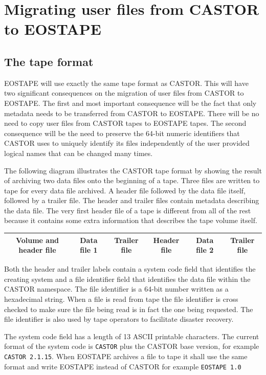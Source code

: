 \documentclass{article}
\begin{document}
\newpage
\section{Migrating user files from CASTOR to EOSTAPE}

\subsection{The tape format}

EOSTAPE will use exactly the same tape format as CASTOR.  This will have two significant consequences on the migration of user files from CASTOR to EOSTAPE.  The first and most important consequence will be the fact that only metadata needs to be transferred from CASTOR to EOSTAPE.  There will be no need to copy user files from CASTOR tapes to EOSTAPE tapes.  The second consequence will be the need to preserve the 64-bit numeric identifiers that CASTOR uses to uniquely identify its files independently of the user provided logical names that can be changed many times.

The following diagram illustrates the CASTOR tape format by showing the result of archiving two data files onto the beginning of a tape.  Three files are written to tape for every data file archived.  A header file followed by the data file itself, followed by a trailer file.  The header and trailer files contain metadata describing the data file.  The very first header file of a tape is different from all of the rest because it contains some extra information that describes the tape volume itself.

\begin{tabular}{|c|c|c|c|c|c|}
	\hline
	Volume and header file & Data file 1 & Trailer file & Header file & Data file 2 & Trailer file \\
	\hline
\end{tabular}

Both the header and trailer labels contain a system code field that identifies the creating system and a file identifier field that identifies the data file within the CASTOR namespace.  The file identifier is a 64-bit number written as a hexadecimal string.  When a file is read from tape the file identifier is cross checked to make sure the file being read is in fact the one being requested.  The file identifier is also used by tape operators to facilitate disaster recovery.

The system code field has a length of 13 ASCII printable characters.  The current format of the system code is \texttt{CASTOR} plus the CASTOR base version, for example \texttt{CASTOR 2.1.15}.  When EOSTAPE archives a file to tape it shall use the same format and write EOSTAPE instead of CASTOR for example \texttt{EOSTAPE 1.0}
\end{document}
